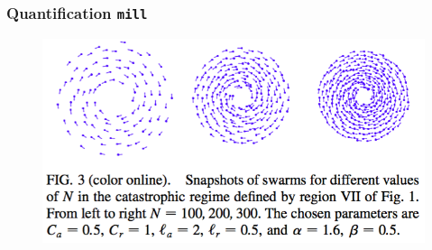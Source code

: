 \documentclass[compress]{beamer}
\begin{document}
\begin{frame}
	\frametitle{Quantification \texttt{mill}}
	
	\begin{figure}[H]
		\includegraphics[width=1.\columnwidth]{./img/snapshots.png}
		\label{snapshots}
	\end{figure}
	
	
\end{frame}
\end{document}
